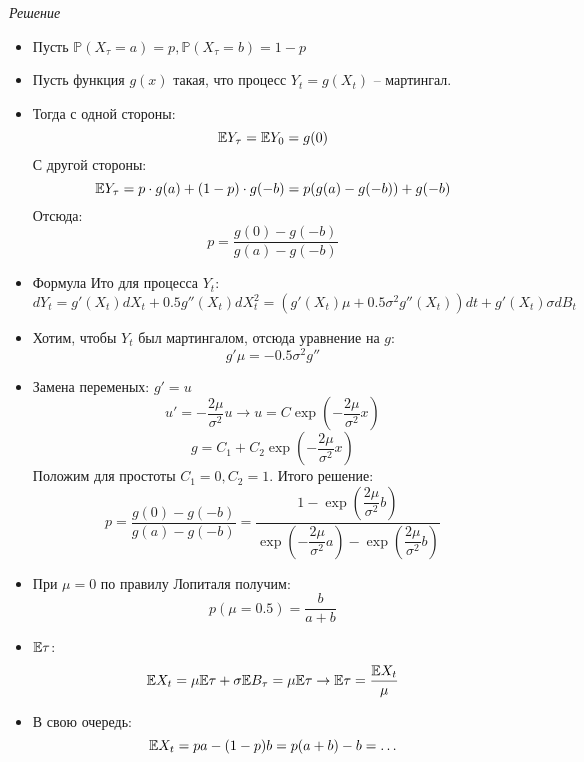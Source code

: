 \documentclass[12pt]{article}
\begin{document}
\textit{Решение}
\begin{itemize}
    \item Пусть $\mathbb{P}(X_{\tau} = a) = p, \mathbb{P}(X_{\tau} = b) = 1-p$
    \item Пусть функция $g(x)$ такая, что процесс $Y_t = g(X_t)$ -- мартингал.
    \item Тогда с одной стороны:
    $$
        \mathbb{E} Y_{\tau} = \mathbb{E} Y_0 = g(0)
    $$С другой стороны:
    $$
    \mathbb{E} Y_{\tau} = p \cdot g(a) + (1-p) \cdot g(-b) = p(g(a) - g(-b)) + g(-b)
    $$Отсюда:
    $$
        p = \dfrac{g(0) - g(-b)}{g(a) - g(-b)}
    $$
    \item Формула Ито для процесса $Y_t$:
    $$
        dY_t = g'(X_t) dX_t + 0.5 g''(X_t) dX_t^2 = \left( g'(X_t) \mu + 0.5 \sigma^2 g''(X_t) \right) dt + g'(X_t) \sigma dB_t
    $$
    \item Хотим, чтобы $Y_t$ был мартингалом, отсюда уравнение на $g$:
    $$
        g' \mu = -0.5 \sigma^2 g''
    $$
    \item Замена переменых: $g' = u$
    $$
        u' = -\dfrac{2 \mu}{\sigma^2} u \to u = C \exp\left(-\dfrac{2 \mu}{\sigma^2}x\right)
    $$
    $$
        g = C_1 + C_2 \exp\left(-\dfrac{2 \mu}{\sigma^2}x\right)
    $$Положим для простоты $C_1 = 0, C_2 = 1$. Итого решение:
    $$
        p = \dfrac{g(0) - g(-b)}{g(a) - g(-b)} = \dfrac{1 - \exp(\dfrac{2 \mu}{\sigma^2}b)}{\exp(-\dfrac{2 \mu}{\sigma^2}a)-\exp(\dfrac{2 \mu}{\sigma^2}b)}
    $$
    \item При $\mu = 0$ по правилу Лопиталя получим:
    $$
        p(\mu = 0.5) = \dfrac{b}{a+b}
    $$
    \item $\mathbb{E} \tau$:
    $$
        \mathbb{E} X_t = \mu \mathbb{E} \tau + \sigma \mathbb{E} B_{\tau} = \mu \mathbb{E} \tau \to \mathbb{E} \tau = \dfrac{\mathbb{E} X_t}{\mu}
    $$
    \item В свою очередь:
    $$
       \mathbb{E} X_t = p a - (1-p)b = p(a + b) - b = \ldots
    $$
\end{itemize}

 
\end{document}
